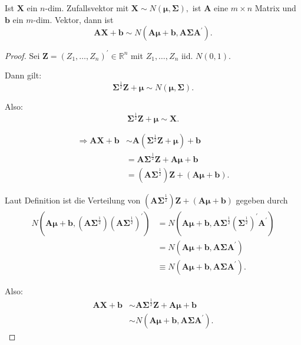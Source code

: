 \documentclass{tstextbook}
\begin{document}
\begin{theorem}[Reproduktionseigenschaft]
  \label{th:repoduktionseigenschaft}
  
  Ist $\textbf{X}$ ein $n$-dim. Zufallsvektor mit $\textbf{X}\sim N(\boldsymbol{\mu},\boldsymbol{\Sigma}),$ ist
  $ \textbf{A} $ eine $m\times n$ Matrix und $\textbf{b}$ ein $m$-dim. Vektor, dann ist
  \[
  \textbf{A}\textbf{X}+\textbf{b}\sim N\left(\textbf{A}\boldsymbol{\mu}+\textbf{b},\textbf{A}\boldsymbol{\Sigma} \textbf{A}^{\prime}\right).
  \]
\end{theorem}
  \begin{proof}
  
  Sei $\textbf{Z}=\left(Z_{1},\ldots,Z_{n}\right)^{\prime}\in\mathbb{R}^{n}$
  mit $Z_{1},\ldots,Z_{n}$ iid. $N(0,1).$
  
  Dann gilt:
  \[
  \boldsymbol{\Sigma}^{\frac{1}{2}}\textbf{Z}+\boldsymbol{\mu}\sim N\left(\boldsymbol{\mu},\boldsymbol{\Sigma}\right).
  \]
  
  Also:
  \[
  \boldsymbol{\Sigma}^{\frac{1}{2}}\textbf{Z}+\boldsymbol{\mu}\sim \textbf{X}.
  \]
  
  \begin{align*}
  	\Rightarrow \textbf{A}\textbf{X}+\textbf{b} & \sim \textbf{A}\left(\boldsymbol{\Sigma}^{\frac{1}{2}}\textbf{Z}+\boldsymbol{\mu}\right)+\textbf{b}\\
  	& =\textbf{A}\boldsymbol{\Sigma}^{\frac{1}{2}}\textbf{Z}+\textbf{A}\boldsymbol{\mu}+\textbf{b}\\
  	& =\left(\textbf{A}\boldsymbol{\Sigma}^{\frac{1}{2}}\right)\textbf{Z}+(\textbf{A}\boldsymbol{\mu}+\textbf{b}).
  \end{align*}
  
  Laut Definition ist die Verteilung von $\left(\mathbf{A}\boldsymbol{\Sigma}^{\frac{1}{2}}\right)\mathbf{Z}+(\mathbf{A}\boldsymbol{\mu}+\mathbf{b})$
  gegeben durch
  \begin{align*}
  	N\left(\mathbf{A}\boldsymbol{\mu}+\mathbf{b},\left(\mathbf{A}\boldsymbol{\Sigma}^{\frac{1}{2}}\right)\left(\mathbf{A}\boldsymbol{\Sigma}^{\frac{1}{2}}\right)^{\prime}\right) & =N\left(\mathbf{A}\boldsymbol{\mu}+\mathbf{b},\mathbf{A}\boldsymbol{\Sigma}^{\frac{1}{2}}\left(\boldsymbol{\Sigma}^{\frac{1}{2}}\right)^{\prime}\mathbf{A}^{\prime}\right)\\
  	& =N\left(\mathbf{A}\boldsymbol{\mu}+\mathbf{b},\mathbf{A}\boldsymbol{\Sigma} \mathbf{A}^{\prime}\right)\\
  	& \equiv N\left(\mathbf{A}\boldsymbol{\mu}+\mathbf{b},\mathbf{A}\boldsymbol{\Sigma} \mathbf{A}^{\prime}\right).
  \end{align*}
  
  Also:
  \begin{align*}
  	\mathbf{A}\mathbf{X}+\mathbf{b} & \sim \mathbf{A}\boldsymbol{\Sigma}^{\frac{1}{2}}\mathbf{Z}+\mathbf{A}\boldsymbol{\mu}+\mathbf{b}\\
  	& \sim N\left(\mathbf{A}\boldsymbol{\mu}+\mathbf{b},\mathbf{A}\boldsymbol{\Sigma} \mathbf{A}^{\prime}\right).
  \end{align*}
\end{proof}
  
\end{document}
